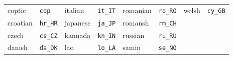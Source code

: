 \documentclass{ltxdockit}
\begin{document}
\begin{center}
\begin{tabular}{alalalal}
coptic     & \texttt{cop}     & italian     & \texttt{it\_IT}  & romanian        & \texttt{ro\_RO} &   welsh           & \texttt{cy\_GB}\\
croatian   & \texttt{hr\_HR}  & japanese    & \texttt{ja\_JP}  & romansh         & \texttt{rm\_CH}\\
czech      & \texttt{cs\_CZ}  & kannada     & \texttt{kn\_IN}  & russian         & \texttt{ru\_RU}\\
danish     & \texttt{da\_DK}  & lao         & \texttt{lo\_LA}  & samin           & \texttt{se\_NO}\\
\bottomrule
\end{tabular}
\end{center}
\end{document}
